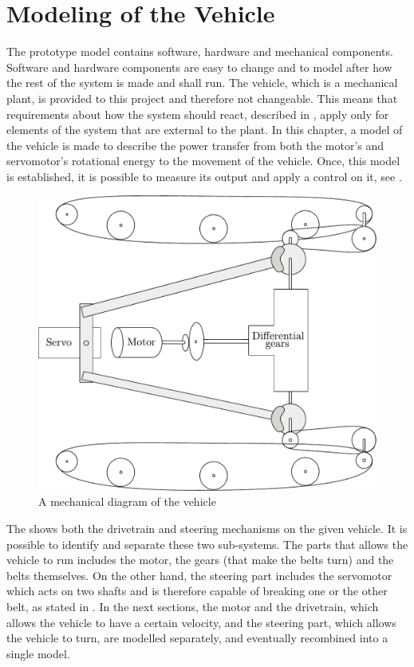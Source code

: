 \chapter{Modeling of the Vehicle}\label{cha:ModelOfVehicle}

The prototype model contains software, hardware and mechanical components. Software and hardware components are easy to change and to model after how the rest of the system is made and shall run. The vehicle, which is a mechanical plant, is provided to this project and therefore not changeable. This means that requirements about how the system should react, described in , apply only for elements of the system that are external to the plant. In this chapter, a model of the vehicle is made to describe the power transfer from both the motor's and servomotor's rotational energy to the movement of the vehicle. Once, this model is established, it is possible to measure its output and apply a control on it, see .


\begin{figure}[H]
	\centering
	\includegraphics[width=\textwidth]{figures/completeMechanical.pdf}
	\caption{A mechanical diagram of the vehicle}
	\label{fig:completeMechanicalDiagram}
\end{figure}

The  shows both the drivetrain and steering mechanisms on the given vehicle. It is possible to identify and separate these two sub-systems. The parts that allows the vehicle to run includes the motor, the gears (that make the belts turn) and the belts themselves. On the other hand, the steering part includes the servomotor which acts on two shafts and is therefore capable of breaking one or the other belt, as stated in . In the next sections, the motor and the drivetrain, which allows the vehicle to have a certain velocity, and the steering part, which allows the vehicle to turn, are modelled separately, and eventually recombined into a single model.